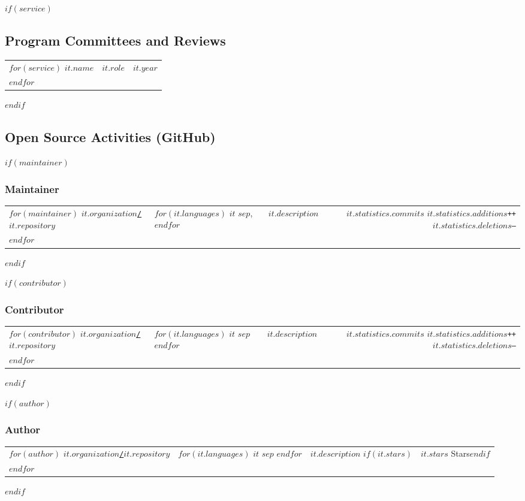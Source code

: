 \documentclass{article}
\newcommand\otherFooter{
  \lfoot{}
  \cfoot{\thepage}
  \rfoot{}
  \renewcommand{\footrulewidth}{0pt} }
\begin{document}
$if(service)$
\subsection*{Program Committees and Reviews}
\begin{tabularx}{\textwidth}{Xlr}
$for(service)$
  $it.name$ & $it.role$ & $it.year$ \\
$endfor$
\end{tabularx}
$endif$

\newpage
\otherFooter

\subsection*{Open Source Activities (GitHub)}

$if(maintainer)$
\subsubsection*{Maintainer}
\newcommand\stats[3]{#1 \ifthenelse{\equal{#1}{1}}{commit}{commits} \textcolor{Greens9p6}{\texttt{#2++}} \textcolor{Reds9p7}{\texttt{#3--}}}
\begin{tabularx}{\textwidth}{llXr}
$for(maintainer)$
  \href{$it.host$/$it.organization$/$it.repository$}{\texttt{$it.organization$/$it.repository$}} & $for(it.languages)$ $it$ $sep$, $endfor$ & $it.description$ & \stats{$it.statistics.commits$}{$it.statistics.additions$}{$it.statistics.deletions$} \\
$endfor$
\end{tabularx}
$endif$

$if(contributor)$
\subsubsection*{Contributor}
\begin{tabularx}{\textwidth}{llXr}
$for(contributor)$
  \href{$it.host$/$it.organization$/$it.repository$}{\texttt{$it.organization$/$it.repository$}} & $for(it.languages)$ $it$ $sep$ $endfor$ & $it.description$ & \stats{$it.statistics.commits$}{$it.statistics.additions$}{$it.statistics.deletions$} \\
$endfor$
\end{tabularx}
$endif$

$if(author)$
\subsubsection*{Author}
\begin{tabularx}{\textwidth}{llXr}
$for(author)$
  \href{$it.host$/$it.organization$/$it.repository$}{\texttt{$it.organization$/$it.repository$}} & $for(it.languages)$ $it$ $sep$ $endfor$ & $it.description$ $if(it.stars)$ & $it.stars$ Stars$endif$ \\
$endfor$
\end{tabularx}
$endif$
\end{document}

